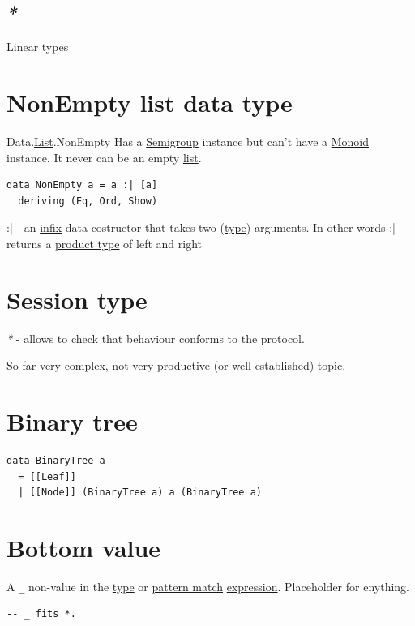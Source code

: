 \documentclass[a4paper,14pt,oneside]{book}
\begin{document}
\subsection{\emph{*}}
\label{sec:org03ae522}

\label{orga20b37f}Linear types

\section{\label{org4f0bc54}NonEmpty list data type}
\label{sec:org9faa29e}
Data.\hyperref[orgab36b30]{List}.NonEmpty
Has a \hyperref[org19d1b2f]{Semigroup} instance but can't have a \hyperref[orgb10cc2a]{Monoid} instance. It never can be an empty \hyperref[orgab36b30]{list}.

\begin{verbatim}
data NonEmpty a = a :| [a]
  deriving (Eq, Ord, Show)
\end{verbatim}

:| - an \hyperref[org57ee440]{infix} data costructor that takes two (\hyperref[org1eff537]{type}) arguments. In other words :| returns a \hyperref[org29355c0]{product type} of left and right

\section{\label{orge5544e3}Session type}
\label{sec:orgf88bbf1}
\emph{*} - allows to check that behaviour conforms to the protocol.

So far very complex, not very productive (or well-established) topic.

\section{\label{orgac4eee6}Binary tree}
\label{sec:org4aa5a95}
\begin{verbatim}
data BinaryTree a
  = [[Leaf]]
  | [[Node]] (BinaryTree a) a (BinaryTree a)
\end{verbatim}

\section{\label{org40aa039}Bottom value}
\label{sec:org41c3139}
A \texttt{\_} non-value in the \hyperref[org1eff537]{type} or \hyperref[org295b237]{pattern match} \hyperref[org7de5a0f]{expression}. Placeholder for enything.

\begin{verbatim}
-- _ fits *.
\end{verbatim}
\end{document}
